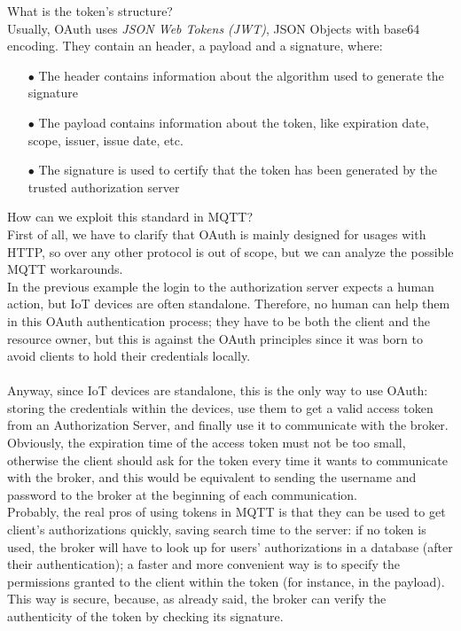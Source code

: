 \documentclass[12pt]{report}
\begin{document}
{{What is the token's structure?\\

Usually, OAuth uses \emph{JSON Web Tokens (JWT)}, JSON Objects with base64 encoding. They contain an header, a payload and a signature, where:

\begin{itemize}
\setlength{\itemindent}{+4mm}
  \item[$\bullet$] The header contains information about the algorithm used to generate the signature
  \item[$\bullet$] The payload contains information about the token, like expiration date, scope, issuer, issue date, etc.
  \item[$\bullet$] The signature is used to certify that the token has been generated by the trusted authorization server
  \end{itemize}

How can we exploit this standard in MQTT?\\

First of all, we have to clarify that OAuth is mainly designed for usages with HTTP, so over any other protocol is out of scope, but we can analyze the possible MQTT workarounds.\\
In the previous example the login to the authorization server expects a human action, but IoT devices are often standalone. Therefore, no human can help them in this OAuth authentication process; they have to be both the client and the resource owner, but this is against the OAuth principles since it was born to avoid clients to hold their credentials locally.\\\\
Anyway, since IoT devices are standalone, this is the only way to use OAuth: storing the credentials within the devices, use them to get a valid access token from an Authorization Server, and finally use it to communicate with the broker.\\Obviously, the expiration time of the access token must not be too small, otherwise the client should ask for the token every time it wants to communicate with the broker, and this would be equivalent to sending the username and password to the broker at the beginning of each communication.\\

Probably, the real pros of using tokens in MQTT is that they can be used to get client's authorizations quickly, saving search time to the server: if no token is used, the broker will have to look up for users' authorizations in a database (after their authentication); a faster and more convenient way is to specify the permissions granted to the client within the token (for instance, in the payload). \\
This way is secure, because, as already said, the broker can verify the authenticity of the token by checking its signature.

}}
\end{document}
